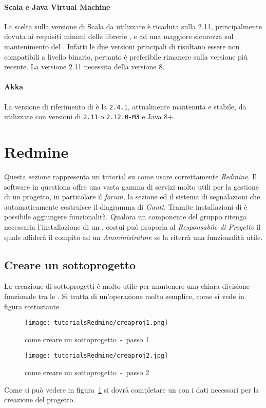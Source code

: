 \documentclass{scalatekids-article}
\begin{document}
\paragraph{Scala e Java Virtual Machine}

La scelta sulla versione di Scala da utilizzare è ricaduta sulla 
2.11, principalmente dovuta ai requisiti minimi delle librerie \textit{}, e
ad una maggiore sicurezza sul mantenimento del . Infatti le due versioni
principali di  risultano essere non compatibili a livello binario,
pertanto è preferibile rimanere sulla versione più recente. La versione 2.11
necessita della  versione 8.

\paragraph{Akka}

La versione di riferimento di  è la \verb=2.4.1=, attualmente
mantenuta e stabile, da utilizzare con versioni di  \verb=2.11= o
\verb=2.12.0-M3= e Java 8+.

\newpage
\appendix

\section{Redmine}

\label{sec:redmine}
Questa sezione rappresenta un tutorial su come usare correttamente \textit{Redmine}. Il software in questiona offre una vasta gamma di servizi molto utili per la gestione di un progetto, in particolare il \textit{forum}, la sezione  ed il sistema di segnalazioni che automaticamente costruisce il diagramma di \textit{Gantt}. Tramite installazioni di  è possibile aggiungere funzionalità. Qualora un componente del gruppo ritenga necessaria l'installazione di un , costui può proporla al \textit{Responsabile di Progetto} il quale affiderà il compito ad un \textit{Amministratore} se la riterrà una funzionalità utile.

\subsection{Creare un sottoprogetto}

La creazione di sottoprogetti è molto utile per mantenere una chiara divisione funzionale tra le . Si tratta di un'operazione molto semplice, come si vede in figura sottostante
\begin{figure}[H]
  \centering
  \texttt{[image: tutorialsRedmine/creaproj1.png]}
  \caption{come creare un sottoprogetto\ -\ passo 1}
\end{figure}
\begin{figure}[H]
  \centering
  \texttt{[image: tutorialsRedmine/creaproj2.jpg]}
  \caption{come creare un sottoprogetto\ -\ passo 2\label{fig:figura-2}}
\end{figure}
Come si può vedere in figura~\ref{fig:figura-2} si dovrà completare un  con i dati necessari per la creazione del progetto.
\end{document}
